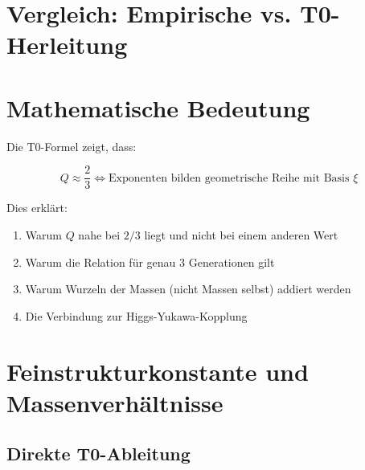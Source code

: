 	\section{Vergleich: Empirische vs. T0-Herleitung}
	
	\begin{table}[h]
		\centering
		\caption{Vergleich der Ansätze}
	\end{table}
	
	\section{Mathematische Bedeutung}
	
	Die T0-Formel zeigt, dass:
	
	\begin{equation}
		Q \approx \frac{2}{3} \iff \text{Exponenten bilden geometrische Reihe mit Basis } \xi
	\end{equation}
	
	Dies erklärt:
	\begin{enumerate}
		\item Warum $Q$ nahe bei $2/3$ liegt und nicht bei einem anderen Wert
		\item Warum die Relation für genau 3 Generationen gilt
		\item Warum Wurzeln der Massen (nicht Massen selbst) addiert werden
		\item Die Verbindung zur Higgs-Yukawa-Kopplung
	\end{enumerate}
	
	\section{Feinstrukturkonstante und Massenverhältnisse}
	
	\subsection{Direkte T0-Ableitung}
	
